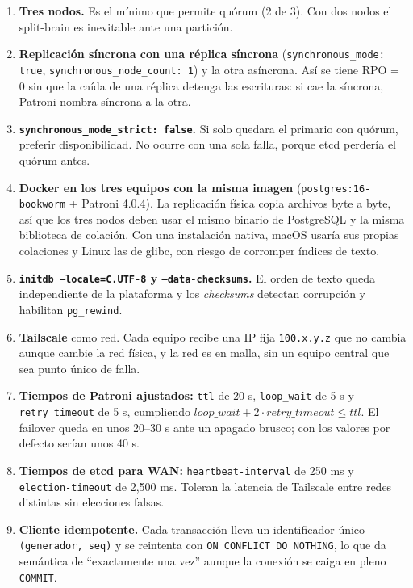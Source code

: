 \documentclass[11pt,a4paper]{article}
\newcommand{\cod}[1]{\texttt{#1}}
\begin{document}
\begin{enumerate}
  \item \textbf{Tres nodos.} Es el mínimo que permite quórum (2 de 3). Con dos nodos el split-brain es inevitable ante una partición.
  \item \textbf{Replicación síncrona con una réplica síncrona} (\cod{synchronous\_mode: true}, \cod{synchronous\_node\_count: 1}) y la otra asíncrona. Así se tiene RPO = 0 sin que la caída de una réplica detenga las escrituras: si cae la síncrona, Patroni nombra síncrona a la otra.
  \item \textbf{\cod{synchronous\_mode\_strict: false}.} Si solo quedara el primario con quórum, preferir disponibilidad. No ocurre con una sola falla, porque etcd perdería el quórum antes.
  \item \textbf{Docker en los tres equipos con la misma imagen} (\cod{postgres:16-bookworm} + Patroni 4.0.4). La replicación física copia archivos byte a byte, así que los tres nodos deben usar el mismo binario de PostgreSQL y la misma biblioteca de colación. Con una instalación nativa, macOS usaría sus propias colaciones y Linux las de glibc, con riesgo de corromper índices de texto.
  \item \textbf{\cod{initdb --locale=C.UTF-8} y \cod{--data-checksums}.} El orden de texto queda independiente de la plataforma y los \emph{checksums} detectan corrupción y habilitan \cod{pg\_rewind}.
  \item \textbf{Tailscale} como red. Cada equipo recibe una IP fija \cod{100.x.y.z} que no cambia aunque cambie la red física, y la red es en malla, sin un equipo central que sea punto único de falla.
  \item \textbf{Tiempos de Patroni ajustados:} \cod{ttl} de 20 s, \cod{loop\_wait} de 5 s y \cod{retry\_timeout} de 5 s, cumpliendo $\mathit{loop\_wait} + 2\cdot\mathit{retry\_timeout} \leq \mathit{ttl}$. El failover queda en unos 20--30 s ante un apagado brusco; con los valores por defecto serían unos 40 s.
  \item \textbf{Tiempos de etcd para WAN:} \cod{heartbeat-interval} de 250 ms y \cod{election-timeout} de 2,500 ms. Toleran la latencia de Tailscale entre redes distintas sin elecciones falsas.
  \item \textbf{Cliente idempotente.} Cada transacción lleva un identificador único \cod{(generador, seq)} y se reintenta con \cod{ON CONFLICT DO NOTHING}, lo que da semántica de ``exactamente una vez'' aunque la conexión se caiga en pleno \cod{COMMIT}.
\end{enumerate}
\end{document}
